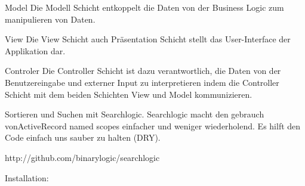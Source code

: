 Model
Die Modell Schicht entkoppelt die Daten von der Business Logic zum manipulieren von Daten.

View
Die View Schicht auch Präsentation Schicht stellt das User-Interface der Applikation dar. 

Controler
Die Controller Schicht ist dazu verantwortlich, die Daten von der Benutzereingabe und externer Input zu interpretieren indem die Controller Schicht mit dem beiden Schichten View und Model kommunizieren.






Sortieren und Suchen mit Searchlogic.
Searchlogic macht den gebrauch vonActiveRecord named scopes einfacher und weniger wiederholend. Es hilft den Code einfach uns sauber zu halten (DRY). 

http://github.com/binarylogic/searchlogic

Installation:


